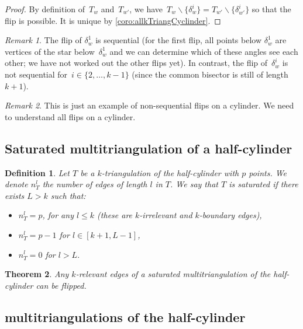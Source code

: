 \documentclass{amsart}
\newtheorem{theorem}{Theorem}[section]
\newtheorem{definition}[theorem]{Definition}
\theoremstyle{remark}
\newtheorem{remark}{Remark}[section]
\newcommand{\darkblue}{\color{darkblue}} %
\newcommand{\defn}[1]{\textsl{\darkblue #1}} %
\newcommand{\ssm}{\smallsetminus} %
\newcommand*{\ktg}[0]{$k$-triangulation\xspace}
\begin{document}
\begin{proof}
By definition of~$T_w$ and~$T_{w'}$, we have~${T_w \ssm \{\delta_w^i\} = T_{w'} \ssm \{\delta_{w'}^i\}}$ so that the flip is possible.
It is unique by \cref{coro:allkTriangCyclinder}.
\end{proof}

\begin{remark}
The flip of $\delta_w^1$ is sequential (for the first flip, all points below $\delta_w^1$ are vertices of the star below~$\delta_w^1$ and we can determine which of these angles see each other; we have not worked out the other flips yet).
In contrast, the flip of~$\delta_w^i$ is not sequential for~$i \in \{2, \dots, k-1\}$ (since the common bisector is still of length~$k+1$).
\end{remark}

\begin{remark}
This is just an example of non-sequential flips on a cylinder. We need to understand all flips on a cylinder.
\end{remark}


\subsection{Saturated multitriangulation of a half-cylinder}

\begin{definition}
Let $T$ be a \ktg of the half-cylinder with $p$ points. We denote $n_T^l$ the number of edges of length $l$ in $T$. We say that $T$ is \defn{saturated} if there exists $L>k$ such that:
\begin{itemize}
\item $n_T^l=p$, for any $l\leq k$ (these are $k$-irrelevant and $k$-boundary edges),
\item $n_T^l=p-1$ for $l\in[k+1,L-1]$,
\item $n_T^l=0$ for $l>L.$ 
\end{itemize}
\end{definition}

\begin{theorem}
\label{thm:flipSaturated}
Any $k$-relevant edges of a saturated multitriangulation of the half-cylinder can be flipped.
\end{theorem}


\subsection{multitriangulations of the half-cylinder}
\end{document}
